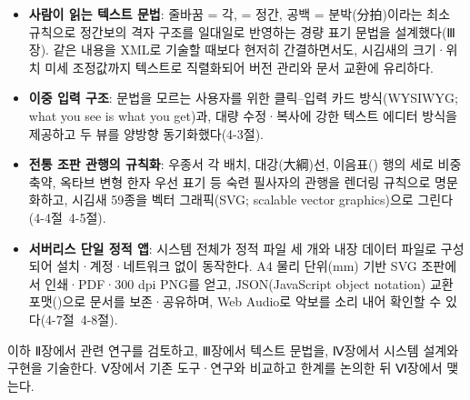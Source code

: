 \begin{itemize}
  \item \textbf{사람이 읽는 텍스트 문법}: 줄바꿈 = 각, \code{|} = 정간,
        공백 = 분박(分拍)이라는 최소 규칙으로 정간보의 격자 구조를
        일대일로 반영하는 경량 표기 문법을 설계했다(Ⅲ장).
        같은 내용을 XML로 기술할 때보다 현저히 간결하면서도,
        시김새의 크기·위치 미세 조정값까지 텍스트로 직렬화되어
        버전 관리와 문서 교환에 유리하다.
  \item \textbf{이중 입력 구조}: 문법을 모르는 사용자를 위한
        클릭--입력 카드 방식(WYSIWYG; what you see is what you get)과,
        대량 수정·복사에 강한
        텍스트 에디터 방식을 제공하고 두 뷰를 양방향 동기화했다(4-3절).
  \item \textbf{전통 조판 관행의 규칙화}: 우종서 각 배치, 대강(大綱)선,
        이음표(\code{-}) 행의 세로 비중 축약, 옥타브 변형 한자 우선 표기 등
        숙련 필사자의 관행을 렌더링 규칙으로 명문화하고,
        시김새 59종을 벡터 그래픽(SVG; scalable vector graphics)으로
        그린다(4-4절~4-5절).
  \item \textbf{서버리스 단일 정적 앱}: 시스템 전체가 정적 파일 세 개와
        내장 데이터 파일로 구성되어 설치·계정·네트워크 없이 동작한다.
        A4 물리 단위(mm) 기반 SVG 조판에서 인쇄·PDF·300 dpi PNG를 얻고,
        JSON(JavaScript object notation) 교환 포맷()으로
        문서를 보존·공유하며,
        Web Audio로 악보를 소리 내어 확인할 수 있다(4-7절~4-8절).
\end{itemize}

이하 Ⅱ장에서 관련 연구를 검토하고, Ⅲ장에서 텍스트 문법을, Ⅳ장에서 시스템
설계와 구현을 기술한다. Ⅴ장에서 기존 도구·연구와 비교하고 한계를 논의한 뒤
Ⅵ장에서 맺는다.
